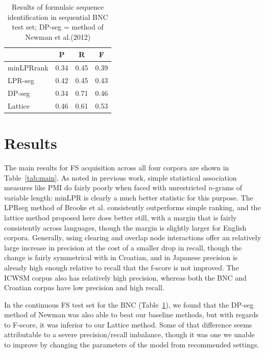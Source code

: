 \documentclass[11pt]{article}
\makeatletter
\def \al {al.\@ }
\newcommand{\tabref}[2][]{Table#1~\ref{#2}\xspace}
\makeatother
\begin{document}
 \begin{table}[!bt]
 
 \begin{center}
  \caption{ Results of formulaic sequence identification in sequential BNC test set; DP-seg = method of Newman et \al (2012)}
	\label{tab:BNC}
	
	 \begin{tabular}{lccc}

       \hline
			& P & R & F\\
			 \hline
			minLPRrank & 0.34 & 0.45 & 0.39 \\
			LPR-seg & 0.42 & 0.45 & 0.43 \\
			DP-seg & 0.34 & 0.71 & 0.46 \\
			Lattice & 0.46 & 0.61 & 0.53 \\
       \hline
 \end{tabular}

 \end{center}

 \end{table}			

\section{Results}

The main results for FS acquisition across all four corpora are shown in \tabref{tab:main}. As noted in previous work, simple statistical association measures like PMI do fairly poorly when faced with unrestricted $n$-grams of variable length: minLPR is clearly a much better statistic for this purpose. The LPRseg method of Brooke et \al {} consistently outperforms simple ranking, and the lattice method proposed here does better still, with a margin that is fairly consistently across languages, though the margin is slightly larger for English corpora. Generally, using clearing and overlap node interactions offer an relatively large increase in precision at the cost of a smaller drop in recall, though the change is fairly symmetrical with in Croatian, and in Japanese precision is already high enough relative to recall that the f-score is not improved. The ICWSM corpus also has relatively high precision, whereas both the BNC and Croatian corpus have low precision and high recall.

In the continuous FS test set for the BNC (\tabref{tab:BNC}), we found that the DP-seg method of Newman \cite{Newman12} was also able to beat our baseline methods, but with regards to F-score, it was inferior to our Lattice method. Some of that difference seems attributable to a severe precision/recall imbalance, though it was one we unable to improve by changing the parameters of the model from recommended settings.
\end{document}
